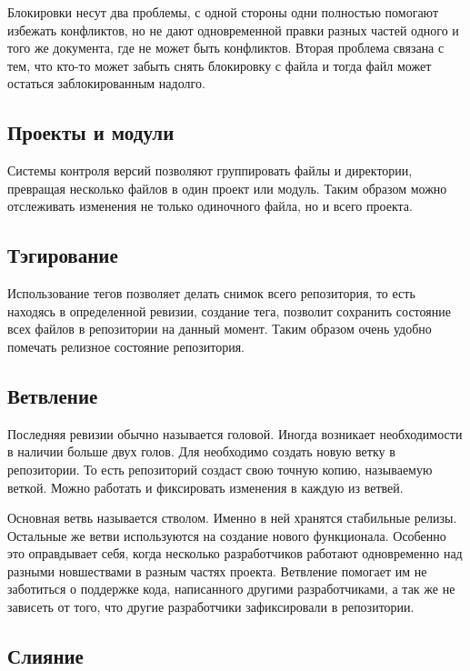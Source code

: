Блокировки несут два проблемы, с одной стороны одни полностью помогают избежать конфликтов, но не дают одновременной правки разных частей одного и того же документа, где не может быть конфликтов. Вторая проблема связана с тем, что кто-то может забыть снять блокировку с файла и тогда файл может остаться заблокированным надолго.


\subsection{ Проекты и модули } \label{sect3_2_9}

Системы контроля версий позволяют группировать файлы и директории, превращая несколько файлов в один проект или модуль. Таким образом можно отслеживать изменения не только одиночного файла, но и всего проекта.

 \subsection{ Тэгирование } \label{sect3_2_10}
 
 Использование тегов позволяет делать снимок всего репозитория, то есть находясь в определенной ревизии, создание тега, позволит сохранить состояние всех файлов в репозитории на данный момент. Таким образом очень удобно помечать релизное состояние репозитория.
 
  \subsection{ Ветвление } \label{sect3_2_11}
  
  Последняя ревизии обычно называется головой. Иногда возникает необходимости в наличии больше двух голов. Для необходимо создать новую ветку в репозитории. То есть репозиторий создаст свою точную копию, называемую веткой. Можно работать и фиксировать изменения в каждую из ветвей.
  
Основная ветвь называется стволом. Именно в ней хранятся стабильные релизы. Остальные же ветви используются на создание нового функционала. Особенно это оправдывает себя, когда несколько разработчиков работают одновременно над разными новшествами в разным частях проекта. Ветвление помогает им не заботиться о поддержке кода, написанного другими разработчиками, а так же не зависеть от того, что другие разработчики зафиксировали в репозитории.

  \subsection{ Слияние } \label{sect3_2_12}
  
